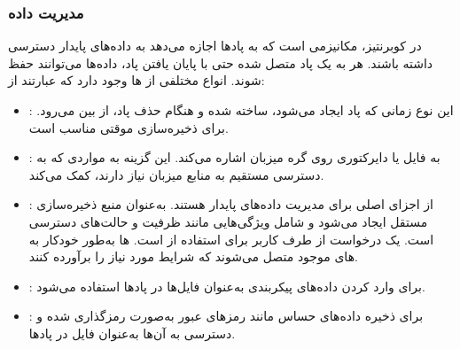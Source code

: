\subsubsection{مدیریت داده}
در کوبرنتیز،  مکانیزمی است که به پادها اجازه می‌دهد به داده‌های پایدار دسترسی داشته باشند. هر  به یک پاد متصل شده حتی با پایان یافتن پاد، داده‌ها می‌توانند حفظ شوند. انواع مختلفی از ها وجود دارد که عبارتند از:
\begin{itemize}
	\item 
	:
	این نوع  زمانی که پاد ایجاد می‌شود، ساخته شده و هنگام حذف پاد، از بین می‌رود. برای ذخیره‌سازی موقتی مناسب است.
	\item
	: 
	به فایل یا دایرکتوری روی گره میزبان اشاره می‌کند. این گزینه به مواردی که به دسترسی مستقیم به منابع میزبان نیاز دارند، کمک می‌کند.
	\item 
	:
	از اجزای اصلی برای مدیریت داده‌های پایدار هستند.  به‌عنوان منبع ذخیره‌سازی مستقل ایجاد می‌شود و شامل ویژگی‌هایی مانند ظرفیت و حالت‌های دسترسی است.  یک درخواست از طرف کاربر برای استفاده از  است. ها به‌طور خودکار به های موجود متصل می‌شوند که شرایط مورد نیاز را برآورده کنند.
	\item 
	:
	برای وارد کردن داده‌های پیکربندی به‌عنوان فایل‌ها در پادها استفاده می‌شود.
	\item 
	:
	برای ذخیره داده‌های حساس مانند رمزهای عبور به‌صورت رمزگذاری شده و دسترسی به آن‌ها به‌عنوان فایل در پادها.
\end{itemize}
























